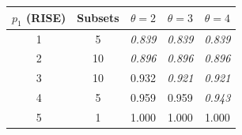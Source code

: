 \begin{tabular}{ccccc}
\toprule
$p_1$ (RISE) & Subsets & $\theta=2$ & $\theta=3$ & $\theta=4$ \\
\midrule
1 & 5 & \textit{0.839} & \textit{0.839} & \textit{0.839} \\
2 & 10 & \textit{0.896} & \textit{0.896} & \textit{0.896} \\
3 & 10 & 0.932 & \textit{0.921} & \textit{0.921} \\
4 & 5 & 0.959 & 0.959 & \textit{0.943} \\
5 & 1 & 1.000 & 1.000 & 1.000 \\
\bottomrule
\end{tabular}
